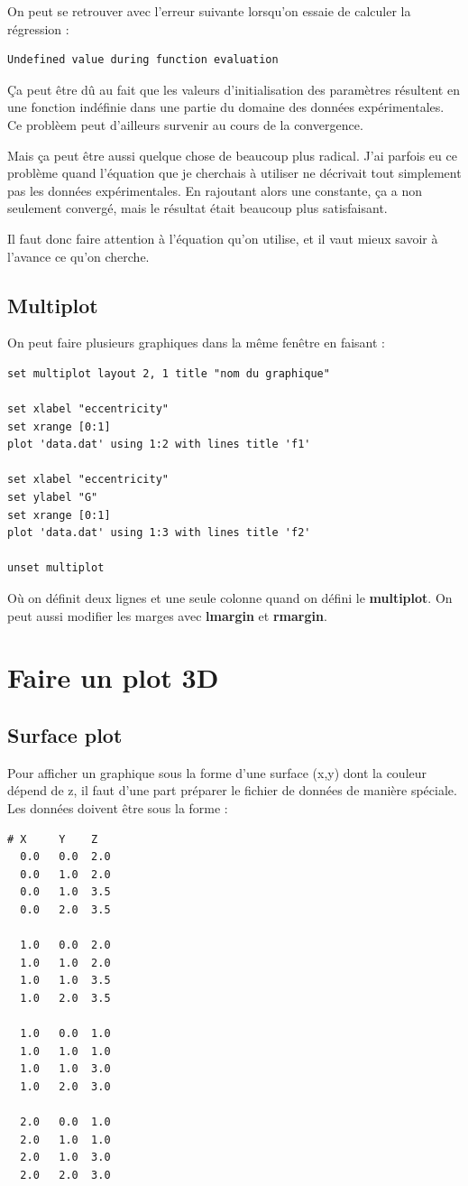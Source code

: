 \documentclass[a4paper,twoside]{article}
\begin{document}
\begin{attention}
On peut se retrouver avec l'erreur suivante lorsqu'on essaie de calculer la régression :
\begin{verbatim}
Undefined value during function evaluation
\end{verbatim}

Ça peut être dû au fait que les valeurs d'initialisation des paramètres résultent en une fonction indéfinie dans une partie du domaine des données expérimentales. Ce problèem peut d'ailleurs survenir au cours de la convergence. 

Mais ça peut être aussi quelque chose de beaucoup plus radical. J'ai parfois eu ce problème quand l'équation que je cherchais à utiliser ne décrivait tout simplement pas les données expérimentales. En rajoutant alors une constante, ça a non seulement convergé, mais le résultat était beaucoup plus satisfaisant. 

Il faut donc faire attention à l'équation qu'on utilise, et il vaut mieux savoir à l'avance ce qu'on cherche.
\end{attention}

\subsection{Multiplot}
On peut faire plusieurs graphiques dans la même fenêtre en faisant :
\begin{verbatim}
set multiplot layout 2, 1 title "nom du graphique"

set xlabel "eccentricity"
set xrange [0:1]
plot 'data.dat' using 1:2 with lines title 'f1'

set xlabel "eccentricity"
set ylabel "G"
set xrange [0:1]
plot 'data.dat' using 1:3 with lines title 'f2'

unset multiplot
\end{verbatim}
Où on définit deux lignes et une seule colonne quand on défini le \textbf{multiplot}. On peut aussi modifier les marges avec \textbf{lmargin} et \textbf{rmargin}.


\section{Faire un plot 3D}
\subsection{Surface plot}
Pour afficher un graphique sous la forme d'une surface (x,y) dont la couleur dépend de z, il faut d'une part préparer le fichier de données de manière spéciale. Les données doivent être sous la forme : 
\begin{verbatim}
# X     Y    Z
  0.0   0.0  2.0
  0.0   1.0  2.0
  0.0   1.0  3.5
  0.0   2.0  3.5

  1.0   0.0  2.0
  1.0   1.0  2.0
  1.0   1.0  3.5
  1.0   2.0  3.5

  1.0   0.0  1.0
  1.0   1.0  1.0
  1.0   1.0  3.0
  1.0   2.0  3.0

  2.0   0.0  1.0
  2.0   1.0  1.0
  2.0   1.0  3.0
  2.0   2.0  3.0
\end{verbatim}
\end{document}
